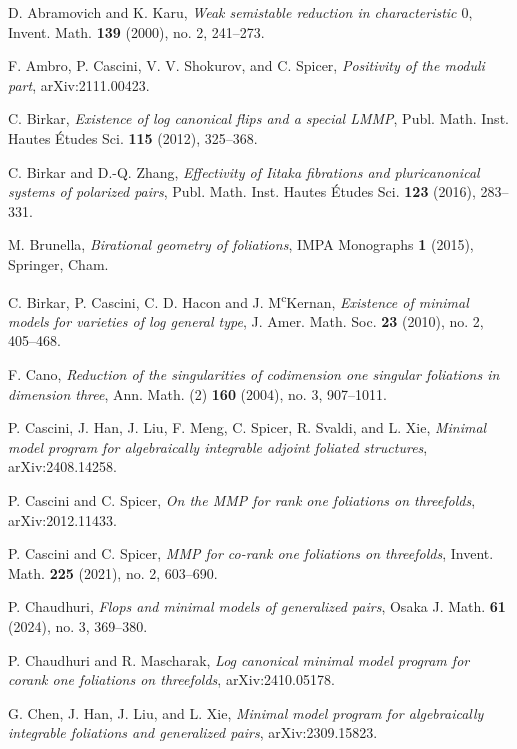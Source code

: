 \documentclass[11pt]{amsart}
\numberwithin{equation}{section}
\theoremstyle{definition}
\theoremstyle{definition}
\theoremstyle{definition}
\begin{document}
\begin{thebibliography}{99}

 D. Abramovich and K. Karu, \textit{Weak semistable reduction in characteristic $0$}, Invent. Math. \textbf{139} (2000), no. 2, 241--273.

 F. Ambro, P. Cascini, V. V. Shokurov, and C. Spicer, \textit{Positivity of the moduli part}, arXiv:2111.00423.


 C. Birkar, \textit{Existence of log canonical flips and a special LMMP}, Publ. Math. Inst. Hautes \'Etudes Sci. \textbf{115} (2012), 325--368.

 C. Birkar and D.-Q. Zhang, \textit{Effectivity of Iitaka fibrations and pluricanonical systems of polarized pairs}, Publ. Math. Inst. Hautes \'Etudes Sci. \textbf{123} (2016), 283--331.

 M. Brunella, \textit{Birational geometry of foliations}, IMPA Monographs \textbf{1} (2015), Springer, Cham.

 C. Birkar, P. Cascini, C. D. Hacon and J. M\textsuperscript{c}Kernan, \textit{Existence of minimal models for varieties of log general type}, J. Amer. Math. Soc. \textbf{23} (2010), no. 2, 405--468.


 F. Cano, \textit{Reduction of the singularities of codimension one singular foliations in dimension three}, Ann. Math. (2) \textbf{160} (2004), no. 3, 907--1011.

 P. Cascini, J. Han, J. Liu, F. Meng, C. Spicer, R. Svaldi, and L. Xie, \textit{Minimal model program for algebraically integrable adjoint foliated structures}, arXiv:2408.14258.


 P. Cascini and C. Spicer, \textit{On the MMP for rank one foliations on threefolds}, arXiv:2012.11433.

 P. Cascini and C. Spicer, \textit{MMP for co-rank one foliations on threefolds}, Invent. Math. \textbf{225} (2021), no. 2, 603–690.

 P. Chaudhuri, \textit{Flops and minimal models of generalized pairs}, Osaka J. Math. \textbf{61} (2024), no. 3, 369--380.

 P. Chaudhuri and R. Mascharak, \textit{Log canonical minimal model program for corank one foliations on threefolds}, arXiv:2410.05178.


 G. Chen, J. Han, J. Liu, and L. Xie, \textit{Minimal model program for algebraically integrable foliations and generalized pairs}, arXiv:2309.15823. 



\end{thebibliography}
\end{document}
